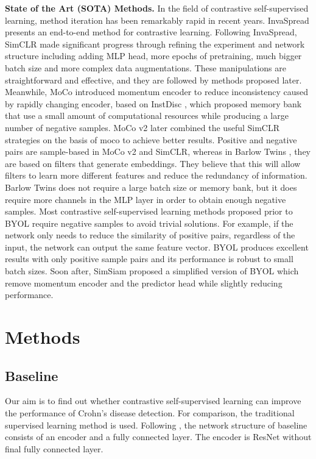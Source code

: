 \documentclass[conference]{IEEEtran}
\begin{document}
\textbf{State of the Art (SOTA) Methods.}
 In the field of contrastive self-supervised learning, method iteration has been remarkably rapid in recent years. InvaSpread\cite{InvaSpread_Ye2019UnsupervisedEL} presents an end-to-end method for contrastive learning. 
Following InvaSpread, SimCLR made significant progress through refining the experiment and network structure including adding MLP head, more epochs of pretraining, much bigger batch size and more complex data augmentations. 
These manipulations are straightforward and effective, and they are followed by methods proposed later. 
Meanwhile, MoCo \cite{he2019moco} introduced momentum encoder to reduce inconsistency caused by rapidly changing encoder, based on InstDisc \cite{InstDisc_Wu2018UnsupervisedFL}, which proposed memory bank that use a small amount of computational resources while producing a large number of negative samples. 
MoCo v2 later combined the useful SimCLR strategies on the basis of moco to achieve better results.
Positive and negative pairs are sample-based in MoCo v2 and SimCLR, whereas in Barlow Twins \cite{BarlowTwins}, they are based on filters that generate embeddings. They believe that this will allow filters to learn more different features and reduce the redundancy of information.
Barlow Twins does not require a large batch size or memory bank, but it does require more channels in the MLP layer in order to obtain enough negative samples.
Most contrastive self-supervised learning methods proposed prior to BYOL \cite{BYOL} require negative samples to avoid trivial solutions. For example, if the network only needs to reduce the similarity of positive pairs, regardless of the input, the network can output the same feature vector. BYOL produces excellent results with only positive sample pairs and its performance is robust to small batch sizes.
Soon after, SimSiam\cite{simsiam} proposed a simplified version of BYOL which remove momentum encoder and the predictor head while slightly reducing performance.






\section{Methods}
\subsection{Baseline}
Our aim is to find out whether contrastive self-supervised learning can improve the performance of Crohn's disease detection. 
For comparison, the traditional supervised learning method is used. Following \cite{crohIPI}, the network structure of baseline consists of an encoder and a fully connected layer. The encoder is ResNet\cite{ResNet} without final fully connected layer. 
\end{document}
